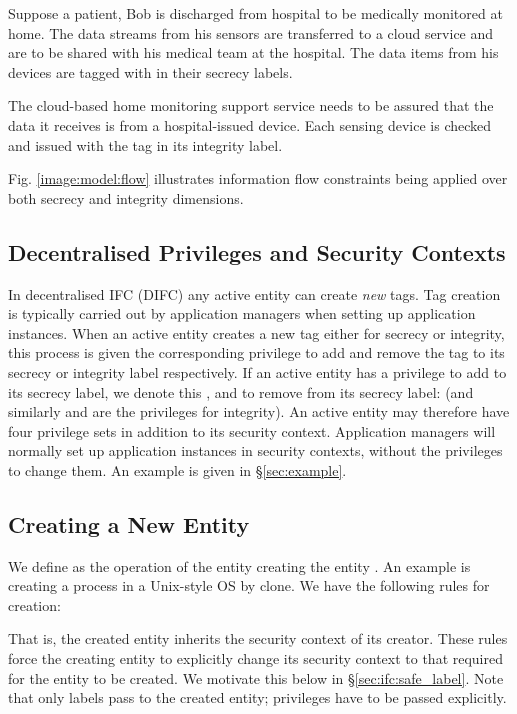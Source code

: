 \documentclass[10pt,journal,compsoc]{IEEEtran}
\begin{document}
Suppose a patient, Bob is discharged from hospital to be medically monitored  at home. The data streams from his sensors are transferred to a cloud service and are to be shared with his medical team at the hospital. The data items from his devices are tagged with  in their secrecy labels.


The cloud-based home monitoring support service needs to be assured that the data it receives is 
from a hospital-issued device. 
Each sensing device is checked and issued with the tag  in its integrity label.

Fig. \ref{image:model:flow} illustrates information flow constraints being applied over both secrecy and integrity dimensions.



\subsection{Decentralised Privileges and Security Contexts}
\label{sec:ifc:privileges}


In decentralised IFC (DIFC) any active entity can create \emph{new} tags. Tag creation is typically carried out by application managers when setting up application instances.
When an active entity creates a new tag either for secrecy or integrity, this process is given the corresponding privilege to add and remove the tag to its secrecy or integrity label respectively. If an active entity  has a privilege to add  to its secrecy label, we denote this , and to remove  from its secrecy label:  (and similarly  and  are the privileges for integrity). 
An active entity may therefore have four privilege sets in addition to its security context.
Application managers will normally set up application instances in security contexts, without the privileges to change them. An example is given in \S\ref{sec:example}.


\subsection{Creating a New Entity}
\label{sec:ifc:create}

We define  as the operation of the entity  creating the entity . An example is creating a process in a Unix-style OS by {\small \textsf{clone}}. We have the following rules for creation:

That is, the created entity inherits the security context of its creator. These rules force the creating entity to explicitly change its security context to that required for the entity to be created. We motivate this below in \S\ref{sec:ifc:safe_label}.
Note that only labels pass to the created entity; privileges 
have to be passed explicitly.
\end{document}
